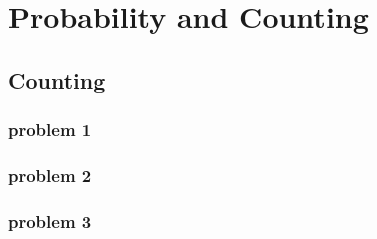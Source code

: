\chapter{Probability and Counting}
\label{ch:pac}
\ifdefined\HCode
\else
{
\startcontents[chapter]
}
\fi
  \section{Counting}
  
  \subsection{problem 1}
  

  \subsection{problem 2}
  

  \subsection{problem 3}
  

\ifdefined\HCode
{}
\fi

\ifdefined\HCode
\else
{
\stopcontents[chapter]
}
\fi